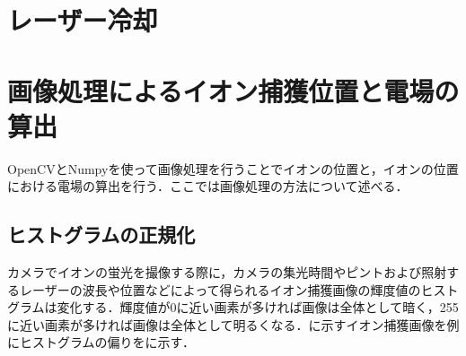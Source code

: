 \section{レーザー冷却}

\section{画像処理によるイオン捕獲位置と電場の算出}
OpenCVとNumpyを使って画像処理を行うことでイオンの位置と，イオンの位置における電場の算出を行う．ここでは画像処理の方法について述べる．
\subsection{ヒストグラムの正規化}
カメラでイオンの蛍光を撮像する際に，カメラの集光時間やピントおよび照射するレーザーの波長や位置などによって得られるイオン捕獲画像の輝度値のヒストグラムは変化する．輝度値が0に近い画素が多ければ画像は全体として暗く，255に近い画素が多ければ画像は全体として明るくなる．に示すイオン捕獲画像を例にヒストグラムの偏りをに示す．
